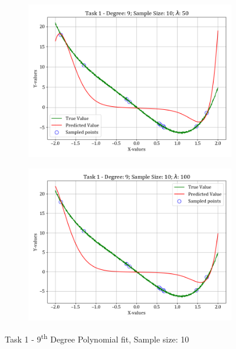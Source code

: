 \documentclass[12pt,a4paper]{article}
\begin{document}
\begin{figure}[H]
\begin{subfigure}{\textwidth}
    \includegraphics[scale=0.45]{images/t1_d1/d_9_size_10_l_50.png}
    \end{subfigure}
    \ContinuedFloat
    \begin{subfigure}{\textwidth}
    \includegraphics[scale=0.45]{images/t1_d1/d_9_size_10_l_100.png}
    \end{subfigure}
    \caption{Task 1 - 9\textsuperscript{th} Degree Polynomial fit, Sample size: 10}
\end{figure}
\end{document}
